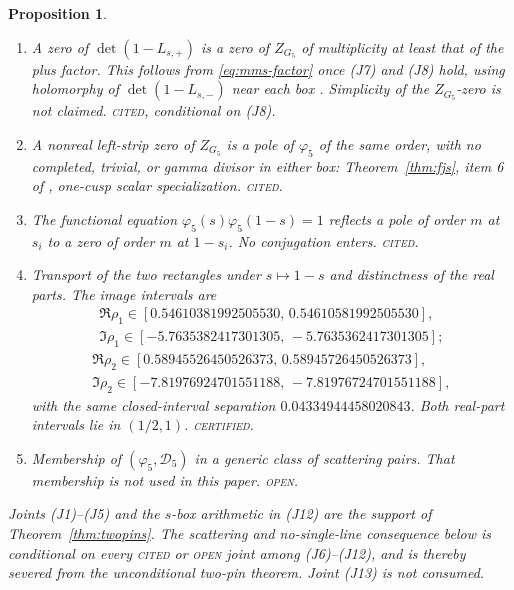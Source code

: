 \documentclass[11pt]{amsart}
\newtheorem{proposition}[theorem]{Proposition}
\theoremstyle{definition}
\theoremstyle{remark}
\newcommand{\phif}{\varphi_5}
\newcommand{\Zf}{Z_{G_5}}
\newcommand{\detp}{\det(1-L_{s,+})}
\begin{document}
\begin{proposition}
\begin{enumerate}
\item[\textup{(J9)}]
A zero of $\detp$ is a zero of $\Zf$ of multiplicity at least that
of the plus factor. This follows from \eqref{eq:mms-factor} once
(J7) and (J8) hold, using holomorphy of $\det(1-L_{s,-})$ near
each box \cite[Theorem 4.10]{MMS2012}. Simplicity of the
$\Zf$-zero is not claimed.
\textsc{cited}, conditional on \textup{(J8)}.

\item[\textup{(J10)}]
A nonreal left-strip zero of $\Zf$ is a pole of $\phif$ of the
same order, with no completed, trivial, or gamma divisor in either
box: Theorem~\ref{thm:fjs}, item 6 of \cite[\S2.5]{FJS2021},
one-cusp scalar specialization.
\textsc{cited}.

\item[\textup{(J11)}]
The functional equation $\phif(s)\phif(1-s)=1$ reflects a pole of
order $m$ at $s_i$ to a zero of order $m$ at $1-s_i$. No
conjugation enters.
\textsc{cited}.

\item[\textup{(J12)}]
Transport of the two rectangles under $s\mapsto 1-s$ and
distinctness of the real parts. The image intervals are
\begin{gather*}
\Re\rho_1\in[0.54610381992505530,\,0.54610581992505530],\\
\Im\rho_1\in[-5.7635382417301305,\,-5.7635362417301305];
\end{gather*}
\begin{gather*}
\Re\rho_2\in[0.58945526450526373,\,0.58945726450526373],\\
\Im\rho_2\in[-7.81976924701551188,\,-7.81976724701551188],
\end{gather*}
with the same closed-interval separation $0.04334944458020843$.
Both real-part intervals lie in $(1/2,1)$.
\textsc{certified}.

\item[\textup{(J13)}]
Membership of $(\phif,\mathcal D_5)$ in a generic class of
scattering pairs. That membership is not used in this paper.
\textsc{open}.
\end{enumerate}
Joints \textup{(J1)}--\textup{(J5)} and the $s$-box arithmetic in
\textup{(J12)} are the support of Theorem~\ref{thm:twopins}. The
scattering and no-single-line consequence below is conditional on
every \textsc{cited} or \textsc{open} joint among
\textup{(J6)}--\textup{(J12)}, and is thereby severed from the
unconditional two-pin theorem. Joint \textup{(J13)} is not consumed.
\end{proposition}
\end{document}
